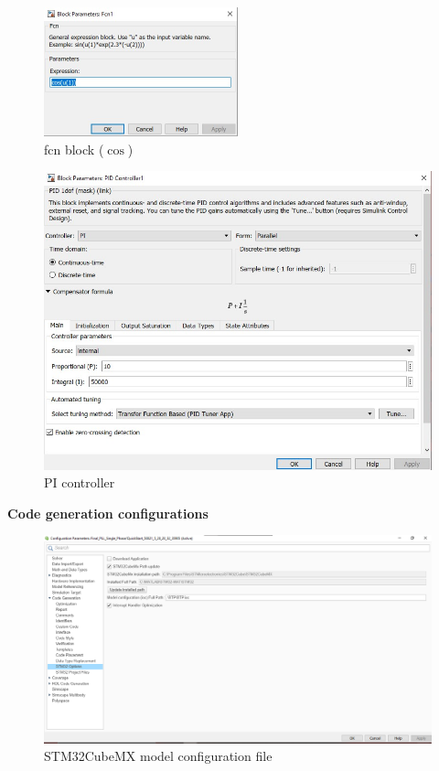 \begin{figure}
    \centering
    \includegraphics[width=0.5\textwidth]{fcn.jpg}
    \caption{fcn block ($\cos$)}
    \label{fcn block}
\end{figure}



\begin{figure}
    \centering
    \includegraphics[width=1.0\textwidth]{PI controller.jpg}
    \caption{PI controller}
    \label{PI controller}
\end{figure}

\textbf{Code generation configurations}
\begin{figure}
    \centering
    \includegraphics[width=1.0\textwidth]{Code generation_Solver.png}
    \caption{STM32CubeMX model configuration file}
    \label{Code generation_Solver.png}
\end{figure}

